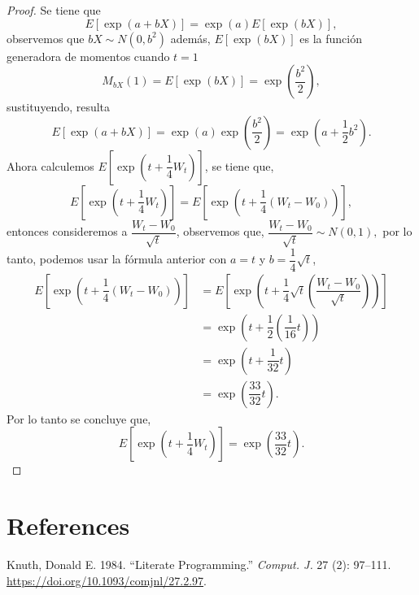 \documentclass[
  letterpaper,
  DIV=11,
  numbers=noendperiod]{scrreprt}
\newlength{\cslhangindent}
\newlength{\cslentryspacingunit} %
\newenvironment{CSLReferences}[2] %
 {%
  \setlength{\parindent}{0pt}
  \ifodd #1
  \let\oldpar\par
  \def\par{\hangindent=\cslhangindent\oldpar}
  \fi
  \setlength{\parskip}{#2\cslentryspacingunit}
 }%
 {}
\theoremstyle{plain}
\theoremstyle{definition}
\theoremstyle{remark}
\begin{document}
\begin{proof}

Se tiene que \[
E\left[\exp\left(a+bX\right)\right]=\exp{(a)}E\left[\exp\left(bX\right)\right],
\] observemos que \(bX\sim N\left(0,b^{2}\right)\) además,
\(E\left[\exp\left(bX\right)\right]\) es la función generadora de
momentos cuando \(t=1\) \[
M_{bX}\left(1\right)=E\left[\exp\left(bX\right)\right]=\exp\left(\dfrac{b^{2}}{2}\right),
\] sustituyendo, resulta \[
E\left[\exp\left(a+bX\right)\right]=\exp{(a)}\exp\left(\dfrac{b^{2}}{2}\right)=\exp\left(a+\dfrac{1}{2}b^{2}\right).
\] Ahora calculemos
\(E\left[\exp\left(t+\dfrac{1}{4}W_{t}\right)\right]\), se tiene que, \[
E\left[\exp\left(t+\dfrac{1}{4}W_{t}\right)\right]=E\left[\exp\left(t+\dfrac{1}{4}\left(W_{t}-W_{0}\right)\right)\right],
\] entonces consideremos a \(\dfrac{W_{t}-W_{0}}{\sqrt{t}}\), observemos
que, \(\dfrac{W_{t}-W_{0}}{\sqrt{t}}\sim N\left(0,1\right),\) por lo
tanto, podemos usar la fórmula anterior con \(a=t\) y
\(b=\dfrac{1}{4}\sqrt{t}\), \[
\begin{align*}
E\left[\exp\left(t+\dfrac{1}{4}\left(W_{t}-W_{0}\right)\right)\right] & = E\left[\exp\left(t+\dfrac{1}{4}\sqrt{t}\left(\dfrac{W_{t}-W_{0}}{\sqrt{t}}\right)\right)\right]\\
& =\exp\left(t+\dfrac{1}{2}\left(\dfrac{1}{16}t\right)\right)\\
 & =\exp\left(t+\dfrac{1}{32}t\right)\\
 & =\exp\left(\dfrac{33}{32}t\right).
\end{align*}
\] Por lo tanto se concluye que, \[
E\left[\exp\left(t+\dfrac{1}{4}W_{t}\right)\right]=\exp\left(\dfrac{33}{32}t\right).
\]

\end{proof}


\hypertarget{references}{%
\chapter*{References}\label{references}}


\hypertarget{refs}{}
\begin{CSLReferences}{1}{0}
\leavevmode{}%
Knuth, Donald E. 1984. {``Literate Programming.''} \emph{Comput. J.} 27
(2): 97--111. \url{https://doi.org/10.1093/comjnl/27.2.97}.

\end{CSLReferences}
\end{document}
